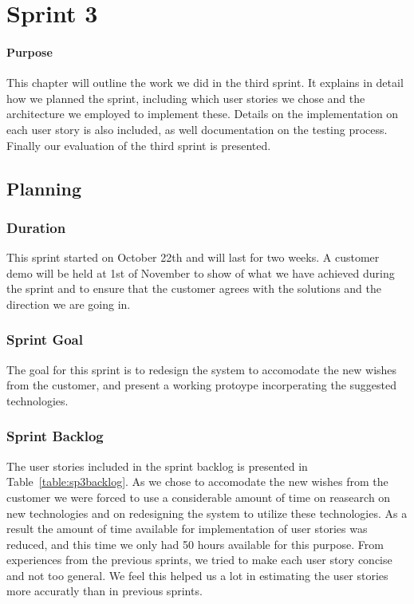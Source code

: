 \chapter{Sprint 3}

\minitoc

\subsubsection{Purpose}

This chapter will outline the work we did in the third sprint. It explains in detail how we planned the sprint, including which user stories we chose and the architecture we employed to implement these. Details on the implementation on each user story is also included, as well documentation on the testing process. Finally our evaluation of the third sprint is presented. 

\clearpage

\section{Planning}

\subsection{Duration}
This sprint started on October 22th and will last for two weeks. A customer demo will be held at 1st of November to show of what we have achieved during the sprint and to ensure that the customer agrees with the solutions and the direction we are going in.

\subsection{Sprint Goal}
The goal for this sprint is to redesign the system to accomodate the new wishes from the customer, and present a working protoype incorperating the suggested technologies.

\subsection{Sprint Backlog}
The user stories included in the sprint backlog is presented in Table~\ref{table:sp3backlog}. As we chose to accomodate the new wishes from the customer we were forced to use a considerable amount of time on reasearch on new technologies and on redesigning the system to utilize these technologies. As a result the amount of time available for implementation of user stories was reduced, and this time we only had 50 hours available for this purpose. From experiences from the previous sprints, we tried to make each user story concise and not too general. We feel this helped us a lot in estimating the user stories more accuratly than in previous sprints.

